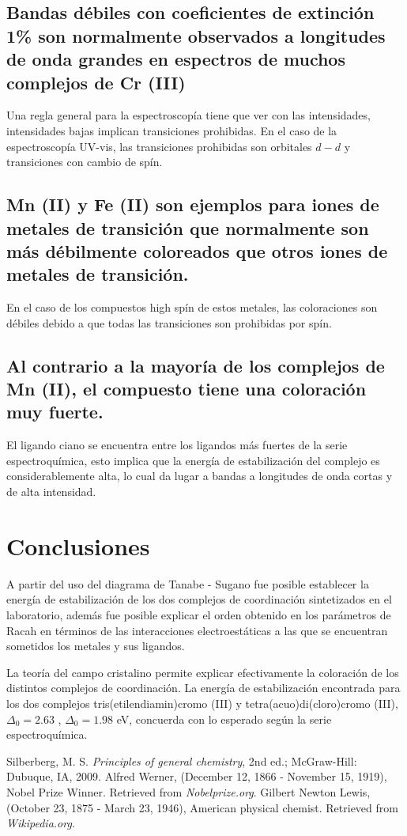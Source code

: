 \documentclass[fleqn,10pt]{SelfArx} %
\begin{document}
	\subsection{Bandas d\'ebiles con coeficientes de extinci\'on 1\% son normalmente observados a longitudes de onda grandes en espectros de muchos complejos de Cr (III)}
	Una regla general para la espectroscop\'ia tiene que ver con las intensidades, intensidades bajas implican transiciones prohibidas. En el caso de la espectroscop\'ia UV-vis, las transiciones prohibidas son orbitales $d-d$ y transiciones con cambio de sp\'in. 
	
	\subsection{Mn (II) y Fe (II) son ejemplos para iones de metales de transici\'on que normalmente son m\'as d\'ebilmente coloreados que otros iones de metales de transici\'on.}
	En el caso de los compuestos high sp\'in de estos metales, las coloraciones son d\'ebiles debido a que todas las transiciones son prohibidas por sp\'in.
	
	
	\subsection{Al contrario a la mayor\'ia de los complejos de Mn (II), el compuesto  tiene una coloraci\'on muy fuerte.}
	El ligando ciano se encuentra entre los ligandos m\'as fuertes de la serie espectroqu\'imica, esto implica que la energ\'ia de estabilizaci\'on del complejo es considerablemente alta, lo cual da lugar a bandas a longitudes de onda cortas y de alta intensidad.
	
	\section{Conclusiones}	
	A partir del uso del diagrama de Tanabe - Sugano fue posible establecer la energ\'ia de estabilizaci\'on de los dos complejos de coordinaci\'on sintetizados en el laboratorio, adem\'as fue posible explicar el orden obtenido en los par\'ametros de Racah en t\'erminos de las interacciones electroest\'aticas a las que se encuentran sometidos los metales y sus ligandos.
	
	La teor\'ia del campo cristalino permite explicar efectivamente la coloraci\'on de los distintos complejos de coordinaci\'on. La energ\'ia de estabilizaci\'on encontrada para los dos complejos tris(etilendiamin)cromo (III) y tetra(acuo)di(cloro)cromo (III), $\Delta_0 = 2.63$ ,  $\Delta_0 = 1.98$ eV,  concuerda con lo esperado seg\'un la serie espectroqu\'imica. 
	
	\pagebreak
	
	\begin{thebibliography}{9}
		Silberberg, M. S. \textit{Principles of general chemistry}, 2nd ed.; McGraw-Hill: Dubuque, IA, 2009.
		Alfred Werner, (December 12, 1866 - November 15, 1919), Nobel Prize Winner. Retrieved from \textit{Nobelprize.org}.
		Gilbert Newton Lewis, (October 23, 1875 - March 23, 1946), American physical chemist. Retrieved from \textit{Wikipedia.org}.	
	\end{thebibliography}
\end{document}
